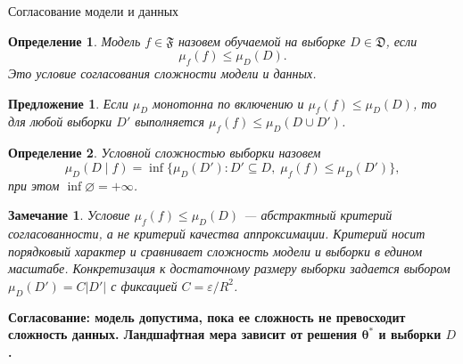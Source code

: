 \documentclass[9pt,pdf,hyperref={unicode}]{beamer}
\newtheorem{rusdefinition}{Определение}
\newtheorem{rusremark}{Замечание}
\newtheorem{rusproposition}{Предложение}
\newcommand{\key}[1]{\par\vspace{0.5ex}\noindent\textbf{\color{darkgreen}#1}}
\begin{document}
\begin{frame}{Согласование модели и данных}
\justifying
\small
\begin{rusdefinition}
    Модель $f\in\mathfrak{F}$ назовем обучаемой на выборке $D\in\mathfrak{D}$, если
    \[
        \mu_f(f)\le\mu_D(D).
    \]
    Это условие согласования сложности модели и данных.
\end{rusdefinition}
\begin{rusproposition}
    Если $\mu_D$ монотонна по включению и $\mu_f(f)\le\mu_D(D)$, то для любой выборки $D'$ выполняется $\mu_f(f)\le\mu_D(D\cup D')$.
\end{rusproposition}
\begin{rusdefinition}
    Условной сложностью выборки назовем
    \[
        \mu_D(D\mid f)=\inf\bigl\{\mu_D(D'): D'\subseteq D,\; \mu_f(f)\le\mu_D(D')\bigr\},
    \]
    при этом $\inf\varnothing=+\infty$.
\end{rusdefinition}
\begin{rusremark}
    Условие $\mu_f(f)\le\mu_D(D)$ --- абстрактный критерий согласованности, а не критерий качества аппроксимации. Критерий носит порядковый характер и сравнивает сложность модели и выборки в едином масштабе. Конкретизация к достаточному размеру выборки задается выбором $\mu_D(D')=C\lvert D'\rvert$ с фиксацией $C=\varepsilon/R^2$.
\end{rusremark}
\key{Согласование: модель допустима, пока ее сложность не превосходит сложность данных. Ландшафтная мера зависит от решения $\boldsymbol{\theta}^*$ и выборки $D$.}
\end{frame}

\end{document}
